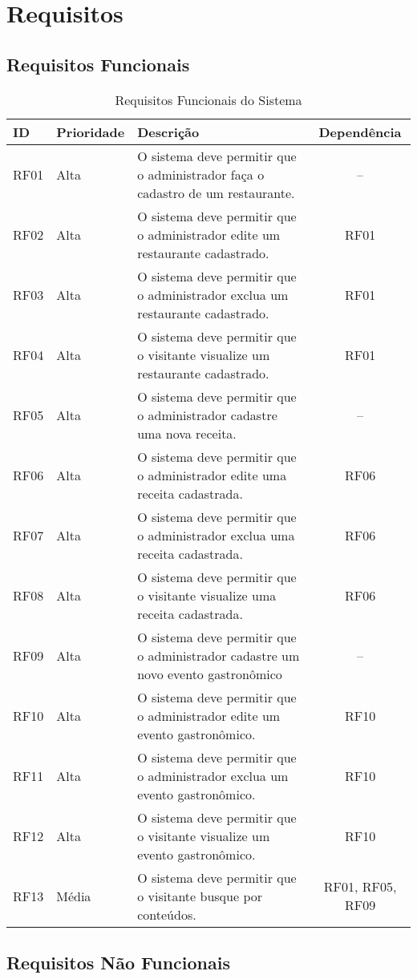 \chapter[Requisitos]{Requisitos}

\section{Requisitos Funcionais}

\begin{table}[H]
\begin{tabular}{|l|l| p{10cm} |c|}
	\hline
	\textbf{ID} & \textbf{Prioridade} & \textbf{Descrição} & \textbf{Dependência}\tabularnewline
	\hline
	\hline
	RF01 & Alta & O sistema deve permitir que o administrador faça o cadastro de um restaurante. & --\tabularnewline
	\hline
	RF02 & Alta & O sistema deve permitir que o administrador edite um restaurante cadastrado. & RF01\tabularnewline
	\hline
	RF03 & Alta & O sistema deve permitir que o administrador exclua um restaurante cadastrado. & RF01\tabularnewline
	\hline
	RF04 & Alta & O sistema deve permitir que o visitante visualize um restaurante cadastrado. & RF01\tabularnewline
	\hline
	RF05 & Alta & O sistema deve permitir que o administrador cadastre uma nova receita. & --\tabularnewline
	\hline
	RF06 & Alta & O sistema deve permitir que o administrador edite uma receita cadastrada. & RF06\tabularnewline
	\hline
	RF07 & Alta & O sistema deve permitir que o administrador exclua uma receita cadastrada. & RF06\tabularnewline
	\hline
	RF08 & Alta & O sistema deve permitir que o visitante visualize uma receita cadastrada. & RF06\tabularnewline
	\hline
	RF09 & Alta & O sistema deve permitir que o administrador cadastre um novo evento gastronômico & --\tabularnewline
	\hline
	RF10 & Alta & O sistema deve permitir que o administrador edite um evento gastronômico. & RF10\tabularnewline
	\hline
	RF11 & Alta & O sistema deve permitir que o administrador exclua um evento gastronômico. & RF10\tabularnewline
	\hline
	RF12 & Alta & O sistema deve permitir que o visitante visualize um evento gastronômico. & RF10\tabularnewline
	\hline
	RF13 & Média & O sistema deve permitir que o visitante busque por conteúdos. & RF01, RF05, RF09\tabularnewline
	\hline
	\hline
\end{tabular}
\caption{Requisitos Funcionais do Sistema}
\label{Requisitos_Funcionais_do_Sistema}
\end{table}


\section{Requisitos Não Funcionais}

